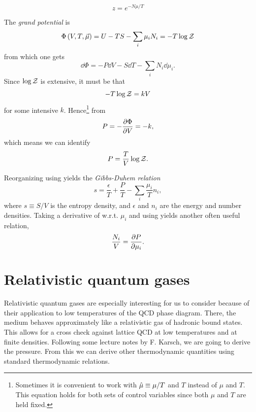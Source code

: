 \begin{equation}\label{eq:fugacity}
  z=e^{-N\mu/T}
\end{equation}

The {\it grand potential} is
\begin{equation}\label{eq:grand}
  \Phi\left(V,T,\vec{\mu}\right)=U-TS-\sum_i\mu_i N_i=-T\log\mathcal{Z}
\end{equation}
from which one gets
\begin{equation}\label{eq:1stlawgrand}
  \dd\Phi=-P\dd{V}-S\dd{T}-\sum_i N_i\dd\mu_i.
\end{equation}
Since $\log\mathcal{Z}$ is extensive, it must be that
\begin{equation}
-T\log\mathcal{Z}=kV
\end{equation}
for some intensive $k$. Hence\footnote{Sometimes it is convenient to work
with $\hat{\mu}\equiv\mu/T$ and $T$ instead of $\mu$ and $T$. This equation
holds for both sets of control variables since both $\mu$ and $T$ are
held fixed.} from 
\begin{equation}
P=-\pdv{\Phi}{V}=-k,
\end{equation}
which means we can identify
\begin{equation}\label{eq:pgrand}
P=\frac{T}{V}\log\mathcal{Z}.
\end{equation}

Reorganizing  using 
yields the {\it Gibbs-Duhem relation}
\begin{equation}
  s=\frac{\epsilon}{T}+\frac{P}{T}-\sum_i\frac{\mu_i}{T}n_i,
\end{equation}
where $s\equiv S/V$ is the entropy density, and $\epsilon$ and $n_i$
are the energy and number densities.
Taking a derivative of  w.r.t. $\mu_i$ and
using  yields
another often useful relation,
\begin{equation}
  \frac{N_i}{V}=\pdv{P}{\mu_i}.
\end{equation}

\section{Relativistic quantum gases}

Relativistic quantum gases are especially interesting for us
to consider because of their
application to low temperatures of the QCD phase diagram. There, the medium
behaves approximately like a relativistic gas of hadronic bound states.
This allows for a cross check against lattice QCD at low temperatures
and at finite densities. Following some lecture notes by F. Karsch,
we are going to derive the
pressure. From this we can derive other thermodynamic quantities
using standard thermodynamic relations.

